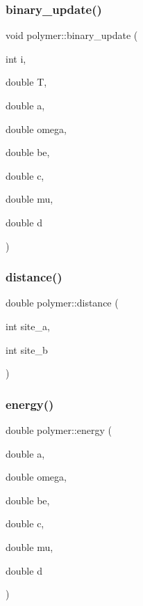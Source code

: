 \subsubsection{\texorpdfstring{binary\+\_\+update()}{binary\_update()}}
{\footnotesize\ttfamily void polymer\+::binary\+\_\+update (\begin{DoxyParamCaption}\item[{int}]{i,  }\item[{double}]{T,  }\item[{double}]{a,  }\item[{double}]{omega,  }\item[{double}]{be,  }\item[{double}]{c,  }\item[{double}]{mu,  }\item[{double}]{d }\end{DoxyParamCaption})}

\hypertarget{classpolymer_aa27a989548b5622fa6eaab87440a31d5}{}\label{classpolymer_aa27a989548b5622fa6eaab87440a31d5} 
\subsubsection{\texorpdfstring{distance()}{distance()}}
{\footnotesize\ttfamily double polymer\+::distance (\begin{DoxyParamCaption}\item[{int}]{site\+\_\+a,  }\item[{int}]{site\+\_\+b }\end{DoxyParamCaption})}

\hypertarget{classpolymer_aff2938b46080f7cf0f3795d23f3d5f17}{}\label{classpolymer_aff2938b46080f7cf0f3795d23f3d5f17} 
\subsubsection{\texorpdfstring{energy()}{energy()}}
{\footnotesize\ttfamily double polymer\+::energy (\begin{DoxyParamCaption}\item[{double}]{a,  }\item[{double}]{omega,  }\item[{double}]{be,  }\item[{double}]{c,  }\item[{double}]{mu,  }\item[{double}]{d }\end{DoxyParamCaption})}

